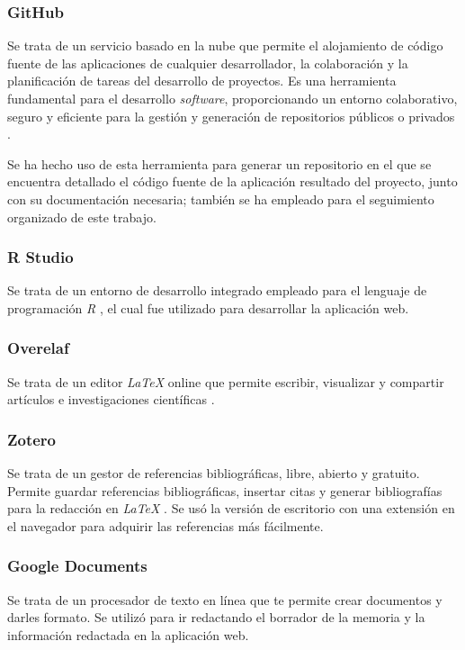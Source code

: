  
\subsubsection{GitHub}
Se trata de un servicio basado en la nube que permite el alojamiento de código fuente de las aplicaciones de cualquier desarrollador, la colaboración y la planificación de tareas del desarrollo de proyectos. Es una herramienta fundamental para el desarrollo \textit{software}, proporcionando un entorno colaborativo, seguro y eficiente para la gestión y generación de repositorios públicos o privados \cite{QueEsGitHub2019}.

Se ha hecho uso de esta herramienta para generar un repositorio en el que se encuentra detallado el código fuente de la aplicación resultado del proyecto, junto con su documentación necesaria; también se ha empleado para el seguimiento organizado de este trabajo.

\subsubsection{R Studio}
Se trata de un entorno de desarrollo integrado empleado para el lenguaje de programación \textit{R} \cite{RStudio2025}, el cual fue utilizado para desarrollar la aplicación web.

\subsubsection{Overelaf}
Se trata de un editor \textit{LaTeX} online que permite escribir, visualizar y compartir artículos e investigaciones científicas \cite{OverleafEdicionDocumentos}.

\subsubsection{Zotero}

Se trata de un gestor de referencias bibliográficas, libre, abierto y gratuito. Permite guardar referencias bibliográficas, insertar citas y generar bibliografías para la redacción en \textit{LaTeX} \cite{ZoteroRedBibliotecas}. Se usó la versión de escritorio con una extensión en el navegador para adquirir las referencias más fácilmente.


\subsubsection{Google Documents}
 Se trata de un procesador de texto en línea que te permite crear documentos y darles formato\cite{ComoUsarDocumentos}. Se utilizó para ir redactando el borrador de la memoria y la información redactada en la aplicación web.


